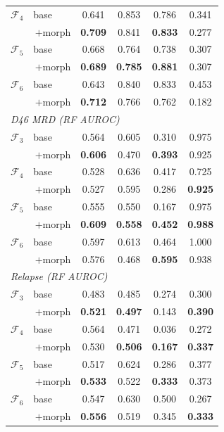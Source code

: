 \documentclass[pdflatex,sn-nature]{sn-jnl}
\begin{document}
\begin{table}[p]
\begin{tabular}{@{}ll cccc@{}}
$\mathcal{F}_4$ & base & 0.641 & 0.853 & 0.786 & 0.341 \\
& \;\,$+$morph & \textbf{0.709} & 0.841 & \textbf{0.833} & 0.277 \\
\addlinespace[2pt]
$\mathcal{F}_5$ & base & 0.668 & 0.764 & 0.738 & 0.307 \\
& \;\,$+$morph & \textbf{0.689} & \textbf{0.785} & \textbf{0.881} & 0.307 \\
\addlinespace[2pt]
$\mathcal{F}_6$ & base & 0.643 & 0.840 & 0.833 & 0.453 \\
& \;\,$+$morph & \textbf{0.712} & 0.766 & 0.762 & 0.182 \\
\midrule
\multicolumn{6}{l}{\textit{D46 MRD (RF AUROC)}} \\
$\mathcal{F}_3$ & base & 0.564 & 0.605 & 0.310 & 0.975 \\
& \;\,$+$morph & \textbf{0.606} & 0.470 & \textbf{0.393} & 0.925 \\
\addlinespace[2pt]
$\mathcal{F}_4$ & base & 0.528 & 0.636 & 0.417 & 0.725 \\
& \;\,$+$morph & 0.527 & 0.595 & 0.286 & \textbf{0.925} \\
\addlinespace[2pt]
$\mathcal{F}_5$ & base & 0.555 & 0.550 & 0.167 & 0.975 \\
& \;\,$+$morph & \textbf{0.609} & \textbf{0.558} & \textbf{0.452} & \textbf{0.988} \\
\addlinespace[2pt]
$\mathcal{F}_6$ & base & 0.597 & 0.613 & 0.464 & 1.000 \\
& \;\,$+$morph & 0.576 & 0.468 & \textbf{0.595} & 0.938 \\
\midrule
\multicolumn{6}{l}{\textit{Relapse (RF AUROC)}} \\
$\mathcal{F}_3$ & base & 0.483 & 0.485 & 0.274 & 0.300 \\
& \;\,$+$morph & \textbf{0.521} & \textbf{0.497} & 0.143 & \textbf{0.390} \\
\addlinespace[2pt]
$\mathcal{F}_4$ & base & 0.564 & 0.471 & 0.036 & 0.272 \\
& \;\,$+$morph & 0.530 & \textbf{0.506} & \textbf{0.167} & \textbf{0.337} \\
\addlinespace[2pt]
$\mathcal{F}_5$ & base & 0.517 & 0.624 & 0.286 & 0.377 \\
& \;\,$+$morph & \textbf{0.533} & 0.522 & \textbf{0.333} & 0.373 \\
\addlinespace[2pt]
$\mathcal{F}_6$ & base & 0.547 & 0.630 & 0.500 & 0.267 \\
& \;\,$+$morph & \textbf{0.556} & 0.519 & 0.345 & \textbf{0.333} \\

\end{tabular}
\end{table}
\end{document}

